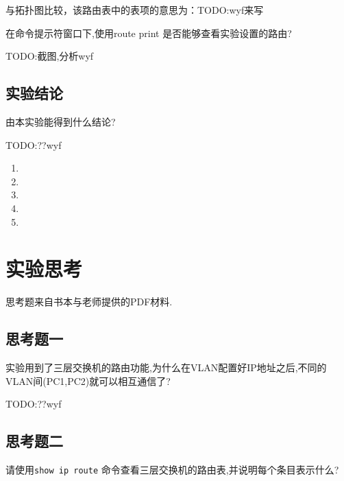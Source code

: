 \documentclass{myreport}
\begin{document}
与拓扑图比较，该路由表中的表项的意思为：TODO:wyf来写



\begin{tcolorbox}[title = {观察四}]
在命令提示符窗口下,使用route print 是否能够查看实验设置的路由?
\end{tcolorbox}

TODO:截图,分析wyf


\subsection{实验结论}
由本实验能得到什么结论?

TODO:??wyf
\begin{enumerate}
    \item 
    \item 
    \item 
    \item 
    \item 
\end{enumerate}

\section{实验思考}

思考题来自书本与老师提供的PDF材料.

\subsection{思考题一}

\begin{tcolorbox}[title = {思考题一}]
实验用到了三层交换机的路由功能,为什么在VLAN配置好IP地址之后,不同的VLAN间(PC1,PC2)就可以相互通信了?
\end{tcolorbox}

TODO:??wyf

\subsection{思考题二}

\begin{tcolorbox}[title = {思考题二}]
请使用\texttt{show ip route} 命令查看三层交换机的路由表,并说明每个条目表示什么?
\end{tcolorbox}
\end{document}
